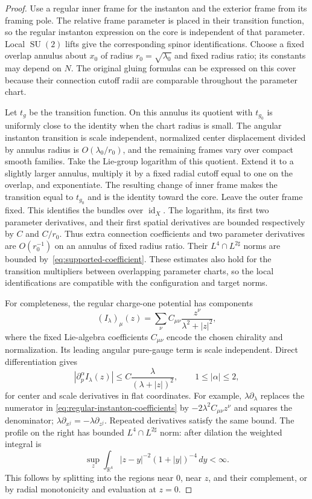 \documentclass[11pt]{amsart}
\theoremstyle{definition}
\theoremstyle{remark}
\theoremstyle{plain}
\newcommand{\RR}{\mathbb{R}}
\newcommand{\id}{\operatorname{id}}
\newcommand{\SU}{\operatorname{SU}}
\begin{document}
\begin{proof}
Use a regular inner frame for the instanton and the exterior frame from
its framing pole.  The relative frame parameter is placed in their
transition function, so the regular instanton expression on the core is
independent of that parameter.  Local $\SU(2)$ lifts give the corresponding
spinor identifications.  Choose a fixed overlap annulus about $x_0$ of
radius $r_0=\sqrt{\lambda_0}$ and fixed radius ratio; its constants may
depend on $N$.  The original gluing formulas can be expressed on this
cover because their connection cutoff radii are comparable throughout
the parameter chart.

Let $t_g$ be the transition function.  On this annulus its quotient with
$t_{g_0}$ is uniformly close to the identity when the chart radius is
small.  The angular instanton transition is scale independent, normalized
center displacement divided by annulus radius is $O(\lambda_0/r_0)$,
and the remaining frames vary over compact smooth families.  Take the
Lie-group logarithm of this quotient.  Extend it to a slightly larger
annulus, multiply it by a fixed radial cutoff equal to one on the overlap,
and exponentiate.  The resulting change of inner frame makes the
transition equal to $t_{g_0}$ and is the identity toward the core.
Leave the outer frame fixed.  This identifies the bundles over $\id_X$.
The logarithm, its first two parameter derivatives, and their first
spatial derivatives are bounded respectively by $C$ and $C/r_0$.
Thus extra connection coefficients and two parameter derivatives are
$O(r_0^{-1})$ on an annulus of fixed radius ratio.  Their
$L^4\cap L^{2\sharp}$ norms are bounded by~\eqref{eq:supported-coefficient}.
These estimates also hold for the transition multipliers between
overlapping parameter charts, so the local identifications are compatible
with the configuration and target norms.

For completeness, the regular charge-one potential has components
\begin{equation}\label{eq:regular-instanton-coefficients}
 (I_\lambda)_\mu(z)
 =\sum_\nu C_{\mu\nu}\frac{z^\nu}{\lambda^2+|z|^2},
\end{equation}
where the fixed Lie-algebra coefficients $C_{\mu\nu}$ encode the chosen
chirality and normalization.  Its leading angular pure-gauge term is
scale independent.  Direct differentiation gives
\begin{equation}\label{eq:instanton-parameter-envelope}
 |\partial_p^\alpha I_\lambda(z)|
 \leq C\frac{\lambda}{(\lambda+|z|)^2},\qquad 1\leq|\alpha|\leq2,
\end{equation}
for center and scale derivatives in flat coordinates.  For example,
$\lambda\partial_\lambda$ replaces the numerator in
\eqref{eq:regular-instanton-coefficients} by
$-2\lambda^2C_{\mu\nu}z^\nu$ and squares the denominator;
$\lambda\partial_{x^j}=-\lambda\partial_{z^j}$.  Repeated derivatives
satisfy the same bound.  The profile on the right has bounded
$L^4\cap L^{2\sharp}$ norm: after dilation the weighted integral is
\[
 \sup_z\int_{\RR^4}|z-y|^{-2}(1+|y|)^{-4}\,dy<\infty.
\]
This follows by splitting into the regions near $0$, near $z$, and their
complement, or by radial monotonicity and evaluation at $z=0$.


\end{proof}
\end{document}
